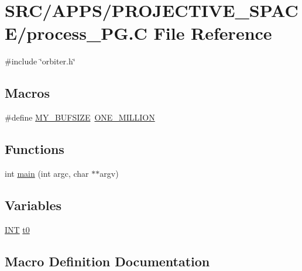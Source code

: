 \hypertarget{process___p_g_8_c}{}\section{S\+R\+C/\+A\+P\+P\+S/\+P\+R\+O\+J\+E\+C\+T\+I\+V\+E\+\_\+\+S\+P\+A\+C\+E/process\+\_\+\+PG.C File Reference}
\label{process___p_g_8_c}
{\ttfamily \#include \char`\"{}orbiter.\+h\char`\"{}}\newline
\subsection*{Macros}
\begin{DoxyCompactItemize}
\item 
\#define \mbox{\hyperlink{process___p_g_8_c_a6079b3b36c54787d2dca2de2fb2c96df}{M\+Y\+\_\+\+B\+U\+F\+S\+I\+ZE}}~\mbox{\hyperlink{galois_8h_a6a146c1b2155b03eb2ffa3f4ba755034}{O\+N\+E\+\_\+\+M\+I\+L\+L\+I\+ON}}
\end{DoxyCompactItemize}
\subsection*{Functions}
\begin{DoxyCompactItemize}
\item 
int \mbox{\hyperlink{process___p_g_8_c_a3c04138a5bfe5d72780bb7e82a18e627}{main}} (int argc, char $\ast$$\ast$argv)
\end{DoxyCompactItemize}
\subsection*{Variables}
\begin{DoxyCompactItemize}
\item 
\mbox{\hyperlink{galois_8h_a09fddde158a3a20bd2dcadb609de11dc}{I\+NT}} \mbox{\hyperlink{process___p_g_8_c_a4268f4fe222ffb119218a0199f5e1904}{t0}}
\end{DoxyCompactItemize}


\subsection{Macro Definition Documentation}
\mbox{\label{process___p_g_8_c_a6079b3b36c54787d2dca2de2fb2c96df}} 
